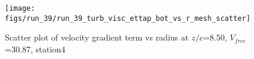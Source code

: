 \begin{figure}[H]
\centering
\texttt{[image: figs/run\_39/run\_39\_turb\_visc\_ettap\_bot\_vs\_r\_mesh\_scatter]}
\caption{Scatter plot of velocity gradient term vs radius at $z/c$=8.50, $V_{free}$=30.87, station4}
\label{fig:run_39_turb_visc_ettap_bot_vs_r_mesh_scatter}
\end{figure}


